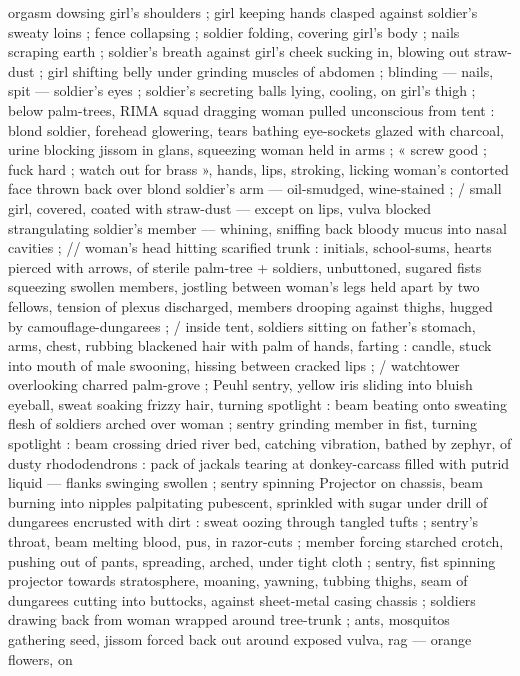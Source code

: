 orgasm dowsing girl's shoulders ; girl keeping hands clasped against
soldier's sweaty loins ; fence collapsing ; soldier folding, covering
girl’s body ; nails scraping earth ; soldier's breath against girl's
cheek sucking in, blowing out straw-dust ; girl shifting belly under
grinding muscles of abdomen ; blinding --- nails, spit --- soldier's
eyes ; soldier's secreting balls lying, cooling, on girl's thigh ; below
palm-trees, RIMA squad dragging woman pulled unconscious from
tent : blond soldier, forehead glowering, tears bathing eye-sockets
glazed with charcoal, urine blocking jissom in glans, squeezing
woman held in arms ; « screw good ; fuck hard ; watch out for brass
», hands, lips, stroking, licking woman's contorted face thrown back %
over blond soldier's arm --- oil-smudged, wine-stained ; / small girl,
covered, coated with straw-dust --- except on lips, vulva blocked
strangulating soldier's member --- whining, sniffing back bloody
mucus into nasal cavities ; // woman's head hitting scarified trunk :
initials, school-sums, hearts pierced with arrows, of sterile palm-tree
+ soldiers, unbuttoned, sugared fists squeezing swollen members,
jostling between woman's legs held apart by two fellows, tension of
plexus discharged, members drooping against thighs, hugged by
camouflage-dungarees ; / inside tent, soldiers sitting on father's
stomach, arms, chest, rubbing blackened hair with palm of hands,
farting : candle, stuck into mouth of male swooning, hissing between
cracked lips ; / watchtower overlooking charred palm-grove ; Peuhl
sentry, yellow iris sliding into bluish eyeball, sweat soaking frizzy
hair, turning spotlight : beam beating onto sweating flesh of soldiers
arched over woman ; sentry grinding member in fist, turning spotlight
: beam crossing dried river bed, catching vibration, bathed by zephyr,
of dusty rhododendrons : pack of jackals tearing at donkey-carcass
filled with putrid liquid --- flanks swinging swollen ; sentry spinning
Projector on chassis, beam burning into nipples palpitating
pubescent, sprinkled with sugar under drill of dungarees encrusted
with dirt : sweat oozing through tangled tufts ; sentry's throat, beam
melting blood, pus, in razor-cuts ; member forcing starched crotch,
pushing out of pants, spreading, arched, under tight cloth ; sentry,
fist spinning projector towards stratosphere, moaning, yawning,
tubbing thighs, seam of dungarees cutting into buttocks, against
sheet-metal casing chassis ; soldiers drawing back from woman
wrapped around tree-trunk ; ants, mosquitos gathering seed, jissom
forced back out around exposed vulva, rag --- orange flowers, on
